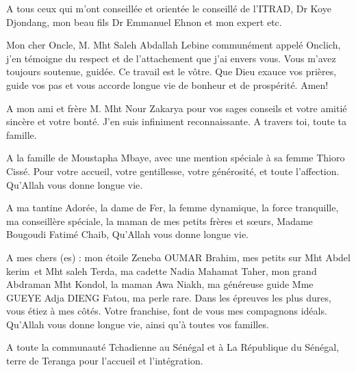 \documentclass[12pt,oneside]{report}
\begin{document}
A tous ceux qui m’ont conseillée et orientée le conseillé de l’ITRAD, Dr Koye Djondang, mon beau fils Dr Emmanuel Ehnon et mon expert etc.

Mon cher Oncle, M. Mht Saleh Abdallah Lebine communément appelé Onclich, j’en témoigne du respect et de l’attachement que j’ai envers vous. Vous m’avez toujours soutenue, guidée. Ce travail est le vôtre. Que Dieu exauce vos prières, guide vos pas et vous accorde longue vie de bonheur et de prospérité. Amen!

A mon ami et frère M. Mht Nour Zakarya pour vos sages conseils et votre amitié sincère et votre bonté. J'en suis infiniment reconnaissante. A travers toi, toute ta famille.

A la famille de Moustapha Mbaye, avec une mention spéciale à sa femme Thioro Cissé. Pour votre accueil, votre gentillesse, votre générosité, et toute l’affection. Qu’Allah vous donne longue vie.

A ma tantine Adorée, la dame de Fer, la femme dynamique, la force tranquille, ma conseillère spéciale, la maman de mes petits frères et sœurs, Madame Bougoudi Fatimé Chaib, Qu’Allah vous donne longue vie.

A mes chers (es) : mon étoile Zeneba OUMAR Brahim, mes petits sur Mht Abdel kerim et Mht saleh Terda, ma cadette Nadia Mahamat Taher, mon grand Abdraman Mht Kondol, la maman Awa Niakh, ma généreuse guide Mme GUEYE Adja DIENG Fatou, ma perle rare. Dans les épreuves les plus dures, vous étiez à mes côtés. Votre franchise, font de vous mes compagnons idéals. Qu’Allah vous donne longue vie, ainsi qu’à toutes vos familles.

A toute la communauté Tchadienne au Sénégal et à La République du Sénégal, terre de Teranga pour l’accueil et l’intégration.
\end{document}
